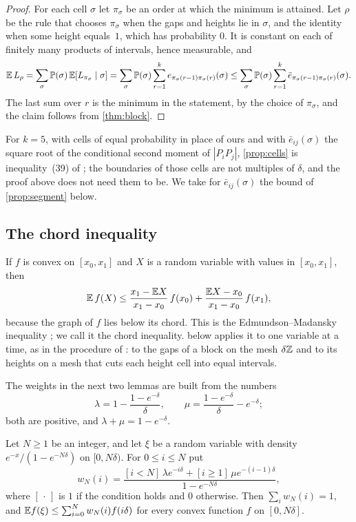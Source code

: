 \begin{proof}
For each cell $\sigma$ let $\pi_\sigma$ be an order at which the minimum is attained. Let $\rho$ be the rule that chooses $\pi_\sigma$ when the gaps and heights lie in $\sigma$, and the identity when some height equals~$1$, which has probability $0$. It is constant on each of finitely many products of intervals, hence measurable, and
\[
\mathbb{E}\,L_\rho=\sum_\sigma\mathbb{P}(\sigma)\,\mathbb{E}[L_{\pi_\sigma}\mid\sigma]=\sum_\sigma\mathbb{P}(\sigma)\sum_{r=1}^{k}e_{\pi_\sigma(r-1)\pi_\sigma(r)}(\sigma)\le\sum_\sigma\mathbb{P}(\sigma)\sum_{r=1}^{k}\bar e_{\pi_\sigma(r-1)\pi_\sigma(r)}(\sigma).
\]
The last sum over $r$ is the minimum in the statement, by the choice of $\pi_\sigma$, and the claim follows from \cref{thm:block}.
\end{proof}

For $k=5$, with cells of equal probability in place of ours and with $\bar e_{ij}(\sigma)$ the square root of the conditional second moment of $|P_iP_j|$, \cref{prop:cells} is inequality~(39) of \cite{DongCao2026}; the boundaries of those cells are not multiples of $\delta$, and the proof above does not need them to be. We take for $\bar e_{ij}(\sigma)$ the bound of \cref{prop:segment} below.

\subsection{The chord inequality}\label{sec:chord}

If $f$ is convex on $[x_0,x_1]$ and $X$ is a random variable with values in $[x_0,x_1]$, then
\begin{equation}\label{eq:chord}
\mathbb{E}\,f(X)\le\frac{x_1-\mathbb{E} X}{x_1-x_0}\,f(x_0)+\frac{\mathbb{E} X-x_0}{x_1-x_0}\,f(x_1),
\end{equation}
because the graph of $f$ lies below its chord. This is the Edmundson--Madansky inequality \cite{Edmundson1957,Madansky1959}; we call it the chord inequality.  below applies it to one variable at a time, as in the procedure of \cite[Sections~3.4.2 and~3.5]{KallWallace1994}: to the gaps of a block on the mesh $\delta\mathbb{Z}$ and to its heights on a mesh that cuts each height cell into equal intervals.

The weights in the next two lemmas are built from the numbers
\[
\lambda=1-\frac{1-e^{-\delta}}{\delta},\qquad\mu=\frac{1-e^{-\delta}}{\delta}-e^{-\delta};
\]
both are positive, and $\lambda+\mu=1-e^{-\delta}$.

\begin{lem}\label{lem:bounded}
Let $N\ge1$ be an integer, and let $\xi$ be a random variable with density $e^{-x}/(1-e^{-N\delta})$ on $[0,N\delta)$. For $0\le i\le N$ put
\[
w_N(i)=\frac{[i<N]\,\lambda e^{-i\delta}+[i\ge1]\,\mu e^{-(i-1)\delta}}{1-e^{-N\delta}},
\]
where $[\,\cdot\,]$ is $1$ if the condition holds and $0$ otherwise. Then $\sum_iw_N(i)=1$, and $\mathbb{E} f(\xi)\le\sum_{i=0}^{N}w_N(i)f(i\delta)$ for every convex function $f$ on $[0,N\delta]$.
\end{lem}

